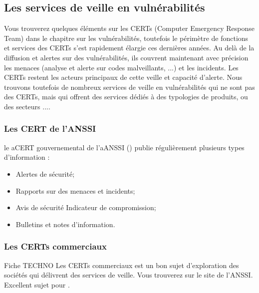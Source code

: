 \uchap{\jobname}

\subsection{Les services de veille en vulnérabilités}

Vous trouverez quelques éléments sur les CERTs (Computer Emergency Response Team) dans le chapitre sur les vulnérabilités, toutefois le périmètre de fonctions et services des CERTs s'est rapidement élargie ces dernières années. Au delà de la diffusion et alertes sur des vulnérabilités, ils couvrent maintenant avec précision les menaces (analyse et alerte sur codes malveillants, ...) et les incidents. Les CERTs restent les acteurs principaux de cette veille et capacité d'alerte.  
Nous trouvons toutefois de nombreux services de veille en vulnérabilités qui ne sont pas des CERTs, mais qui offrent des services dédiés à des typologies de produits, ou des secteurs ....

\subsubsection{Les CERT de l'ANSSI}


le \gls{aCERT} gouvernemental de l'\gls{aANSSI} () publie régulièrement plusieurs types d'information :

\begin{itemize}
  \item Alertes de sécurité;
  \item Rapports sur des menaces et incidents;
  \item Avis de sécurité Indicateur de compromission;
  \item Bulletins et notes d'information.
\end{itemize}



\subsubsection{Les CERTs commerciaux}

\begin{techworkbox}{Fiche TECHNO}
	Les CERTs commerciaux est un bon sujet d'exploration des sociétés qui délivrent des services de veille. Vous trouverez 
	 sur le site de l'ANSSI.  Excellent sujet pour \fichetech.
\end{techworkbox}

